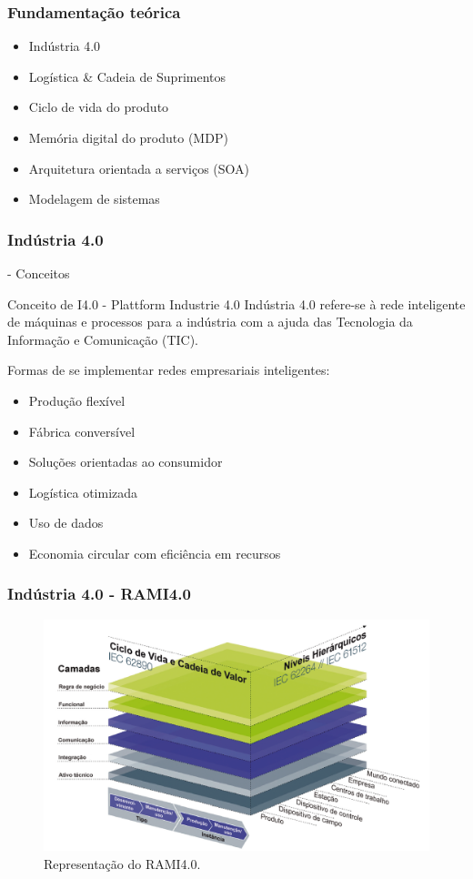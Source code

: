 \documentclass[10pt]{beamer}
\begin{document}
\begin{frame}
	\frametitle{Fundamentação teórica}

	\begin{itemize}
		\item Indústria 4.0
		\item Logística \& Cadeia de Suprimentos
		\item Ciclo de vida do produto
		\item Memória digital do produto (MDP)
		\item Arquitetura orientada a serviços (SOA)
		\item Modelagem de sistemas
	\end{itemize}

\end{frame}
\begin{frame}
	\frametitle{Indústria 4.0} - Conceitos
	
	\begin{block}{Conceito de I4.0 - Plattform Industrie 4.0 }
		Indústria 4.0 refere-se à rede inteligente de máquinas e processos para a indústria com a ajuda das Tecnologia da Informação e Comunicação (TIC).
	\end{block}

	Formas de se implementar redes empresariais inteligentes:
	
	\begin{itemize}
		\item Produção flexível
		\item Fábrica conversível
		\item Soluções orientadas ao consumidor
		\item Logística otimizada
		\item Uso de dados
		\item Economia circular com eficiência em recursos
	\end{itemize}
	
\end{frame}
\begin{frame}
	\frametitle{Indústria 4.0 - RAMI4.0}
	
	\begin{figure}[htb]
		\centering
		\caption{Representação do RAMI4.0.}
		\label{fig:rami4}
		\includegraphics[width=1\textwidth]{rami4.png}
	\end{figure}
	
\end{frame}
\end{document}
